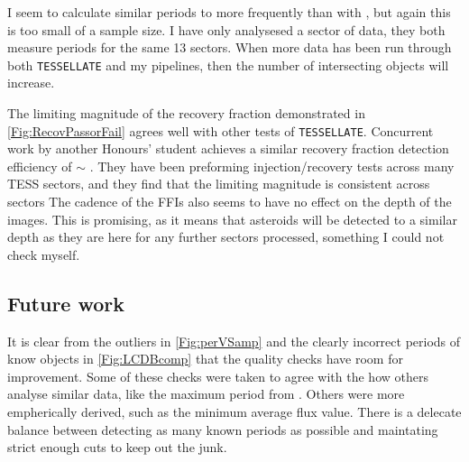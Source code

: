 \documentclass{UCreport}
\begin{document}
I seem to calculate similar periods to \citeauthor{Pal2020} more frequently than with \citeauthor{McNeill2023}, but again this is too small of a sample size.
I have only analysesed a sector of data, they both measure periods for the same 13 sectors. %
When more data has been run through both \texttt{TESSELLATE} and my pipelines, then the number of intersecting objects will increase.

\begin{table}[!t]
  \centering
  \caption[TESS Literature Comparison Table]{The 8 asteroids have rotation periods in this work rounded to two decimal places, as well as \citet{Pal2020} and \citet{McNeill2023}. All periods are measured in hours (\unit{\hour})} \label{Tab:AllPers}
\end{table}


The limiting magnitude of the recovery fraction demonstrated in \autoref{Fig:RecovPassorFail} agrees well with other tests of \texttt{TESSELLATE}.
Concurrent work by another Honours' student \citep{MontillaHons} achieves a similar recovery fraction detection efficiency of $\sim$ \unit{\mag}.
They have been preforming injection/recovery tests across many TESS sectors, and they find that the limiting magnitude is consistent across sectors
The cadence of the FFIs also seems to have no effect on the depth of the images.
This is promising, as it means that asteroids will be detected to a similar depth as they are here for any further sectors processed, something I could not check myself.

\subsection{Future work}

It is clear from the outliers in \autoref{Fig:perVSamp} and the clearly incorrect periods of know objects in \autoref{Fig:LCDBcomp} that the quality checks have room for improvement.
Some of these checks were  taken to agree with the how others analyse similar data, like the maximum period from \citet{McNeill2023}.
Others were more empherically derived, such as the minimum average flux value.
There is a delecate balance between detecting as many known periods as possible and maintating strict enough cuts to keep out the junk.
\end{document}
